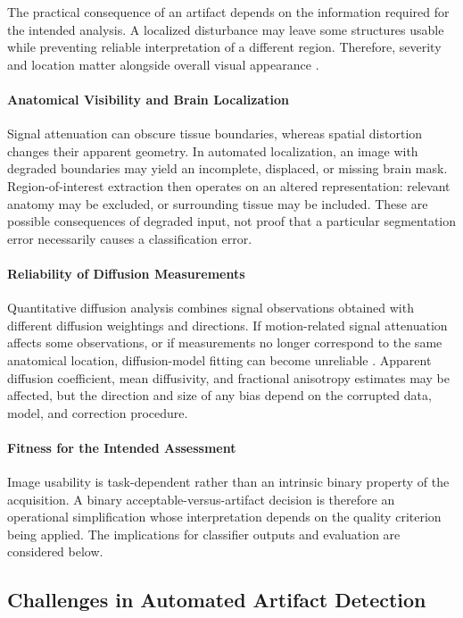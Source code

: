 The practical consequence of an artifact depends on the information required for the intended analysis. A localized disturbance may leave some structures usable while preventing reliable interpretation of a different region. Therefore, severity and location matter alongside overall visual appearance \autocite{malamateniou2013motion,snoussi2025haitch}.

\paragraph{Anatomical Visibility and Brain Localization}
Signal attenuation can obscure tissue boundaries, whereas spatial distortion changes their apparent geometry. In automated localization, an image with degraded boundaries may yield an incomplete, displaced, or missing brain mask. Region-of-interest extraction then operates on an altered representation: relevant anatomy may be excluded, or surrounding tissue may be included. These are possible consequences of degraded input, not proof that a particular segmentation error necessarily causes a classification error.

\paragraph{Reliability of Diffusion Measurements}
Quantitative diffusion analysis combines signal observations obtained with different diffusion weightings and directions. If motion-related signal attenuation affects some observations, or if measurements no longer correspond to the same anatomical location, diffusion-model fitting can become unreliable \autocite{snoussi2025haitch}. Apparent diffusion coefficient, mean diffusivity, and fractional anisotropy estimates may be affected, but the direction and size of any bias depend on the corrupted data, model, and correction procedure.

\paragraph{Fitness for the Intended Assessment}
Image usability is task-dependent rather than an intrinsic binary property of the acquisition. A binary acceptable-versus-artifact decision is therefore an operational simplification whose interpretation depends on the quality criterion being applied. The implications for classifier outputs and evaluation are considered below.

\subsection{Challenges in Automated Artifact Detection}

